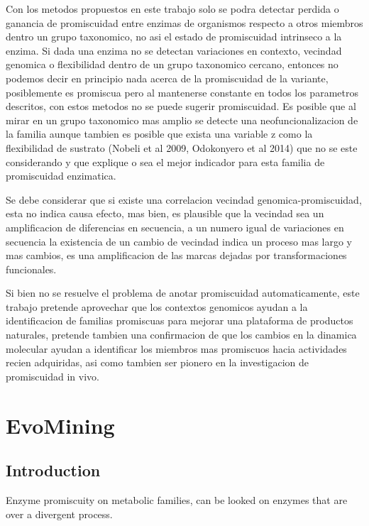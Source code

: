\documentclass[12pt,twoside]{reedthesis}
\begin{document}
  Con los metodos propuestos en este trabajo solo se podra detectar
  perdida o ganancia de promiscuidad entre enzimas de organismos respecto
  a otros miembros dentro un grupo taxonomico, no asi el estado de
  promiscuidad intrinseco a la enzima. Si dada una enzima no se detectan
  variaciones en contexto, vecindad genomica o flexibilidad dentro de un
  grupo taxonomico cercano, entonces no podemos decir en principio nada
  acerca de la promiscuidad de la variante, posiblemente es promiscua pero
  al mantenerse constante en todos los parametros descritos, con estos
  metodos no se puede sugerir promiscuidad. Es posible que al mirar en un
  grupo taxonomico mas amplio se detecte una neofuncionalizacion de la
  familia aunque tambien es posible que exista una variable z como la
  flexibilidad de sustrato (Nobeli et al 2009, Odokonyero et al 2014) que
  no se este considerando y que explique o sea el mejor indicador para
  esta familia de promiscuidad enzimatica.
  
  Se debe considerar que si existe una correlacion vecindad
  genomica-promiscuidad, esta no indica causa efecto, mas bien, es
  plausible que la vecindad sea un amplificacion de diferencias en
  secuencia, a un numero igual de variaciones en secuencia la existencia
  de un cambio de vecindad indica un proceso mas largo y mas cambios, es
  una amplificacion de las marcas dejadas por transformaciones
  funcionales.
  
  Si bien no se resuelve el problema de anotar promiscuidad
  automaticamente, este trabajo pretende aprovechar que los contextos
  genomicos ayudan a la identificacion de familias promiscuas para mejorar
  una plataforma de productos naturales, pretende tambien una confirmacion
  de que los cambios en la dinamica molecular ayudan a identificar los
  miembros mas promiscuos hacia actividades recien adquiridas, asi como
  tambien ser pionero en la investigacion de promiscuidad in vivo.
  
  \chapter{EvoMining}\label{rmd-basics}
  
  \section{Introduction}\label{introduction-1}
  
  Enzyme promiscuity on metabolic families, can be looked on enzymes that
  are over a divergent process.
  
\end{document}
